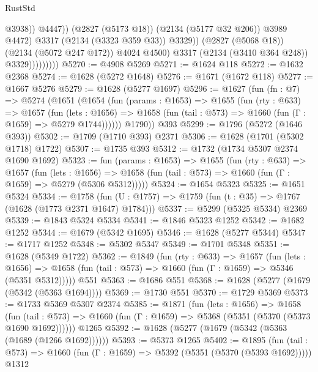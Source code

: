 \begin{lexlean}{RustStd}
\begin{coremodule}
                                      @3938))
                                  @4447))
                              (@2827 (@5173 @18))
                              (@2134 (@5177 @32 @206))
                              @3989
                              @4472)
                            @3317
                            (@2134 (@3323 @359 @33))
                            @3329))
                        (@2827 (@5068 @18))
                        (@2134 (@5072 @247 @172))
                        @4024
                        @4500)
                      @3317
                      (@2134 (@3410 @364 @248))
                      @3329)))))))))
@5270 := @4908 @5269
@5271 := @1624 @118
@5272 := @1632 @2368
@5274 := @1628 (@5272 @1648)
@5276 := @1671 (@1672 @118)
@5277 := @1667 @5276
@5279 := @1628 (@5277 @1697)
@5296 := @1627
    (fun (fn : @7) =>
    @5274
      (@1651
        (@1654
          (fun (params : @1653) =>
          @1655
            (fun (rty : @633) =>
            @1657
              (fun (lets : @1656) =>
              @1658 (fun (tail : @573) => @1660 (fun (Γ : @1659) => @5279 @1744))))))
        @1790))
    @393
@5299 := @1796 (@5272 (@1646 @393))
@5302 := @1709 (@1710 @393) @2371
@5306 := @1628 (@1701 (@5302 @1718) @1722)
@5307 := @1735 @393
@5312 := @1732 (@1734 @5307 @2374 @1690 @1692)
@5323 := fun (params : @1653) =>
  @1655
    (fun (rty : @633) =>
    @1657
      (fun (lets : @1656) =>
      @1658 (fun (tail : @573) => @1660 (fun (Γ : @1659) => @5279 (@5306 @5312)))))
@5324 := @1654 @5323
@5325 := @1651 @5324
@5334 := @1758 (fun (U : @1757) => @1759 (fun (t : @35) => @1767 (@1628 (@1773 @2371 @1647) @1784)))
@5337 := @5299 (@5325 @5334) @2369
@5339 := @1843 @5324 @5334
@5341 := @1846 @5323 @1252
@5342 := @1682 @1252
@5344 := @1679 (@5342 @1695)
@5346 := @1628 (@5277 @5344)
@5347 := @1717 @1252
@5348 := @5302 @5347
@5349 := @1701 @5348
@5351 := @1628 (@5349 @1722)
@5362 := @1849
    (fun (rty : @633) =>
    @1657
      (fun (lets : @1656) =>
      @1658 (fun (tail : @573) => @1660 (fun (Γ : @1659) => @5346 (@5351 @5312)))))
    @551
@5363 := @1686 @551
@5368 := @1628 (@5277 (@1679 (@5342 (@5363 @1694))))
@5369 := @1730 @551
@5370 := @1729 @5369
@5373 := @1733 @5369 @5307 @2374
@5385 := @1871
    (fun (lets : @1656) =>
    @1658
      (fun (tail : @573) => @1660 (fun (Γ : @1659) => @5368 (@5351 (@5370 (@5373 @1690 @1692))))))
    @1265
@5392 := @1628 (@5277 (@1679 (@5342 (@5363 (@1689 (@1266 @1692))))))
@5393 := @5373 @1265
@5402 := @1895
    (fun (tail : @573) => @1660 (fun (Γ : @1659) => @5392 (@5351 (@5370 (@5393 @1692)))))
    @1312

\end{coremodule}
\end{lexlean}
